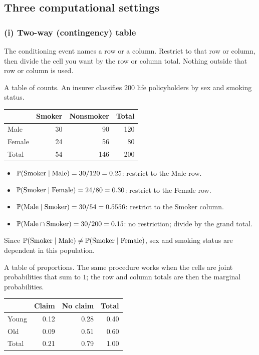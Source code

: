 \subsection{Three computational settings}

\subsubsection*{(i) Two-way (contingency) table}

The conditioning event names a row or a column. Restrict to that row or column,
then divide the cell you want by the row or column total. Nothing outside that
row or column is used.

A table of counts. An insurer classifies $200$ life policyholders by sex and
smoking status.

\begin{center}
\begin{tabular}{@{}lrrr@{}}
\toprule
 & Smoker & Nonsmoker & Total \\
\midrule
Male   & 30 & 90  & 120 \\
Female & 24 & 56  & 80  \\
\midrule
Total  & 54 & 146 & 200 \\
\bottomrule
\end{tabular}
\end{center}

\begin{itemize}[nosep]
\item $\mathbb{P}(\text{Smoker} \mid \text{Male}) = 30/120 = 0.25$: restrict to the Male row.
\item $\mathbb{P}(\text{Smoker} \mid \text{Female}) = 24/80 = 0.30$: restrict to the Female row.
\item $\mathbb{P}(\text{Male} \mid \text{Smoker}) = 30/54 = 0.5556$: restrict to the Smoker column.
\item $\mathbb{P}(\text{Male} \cap \text{Smoker}) = 30/200 = 0.15$: no restriction; divide by the grand total.
\end{itemize}
Since $\mathbb{P}(\text{Smoker} \mid \text{Male}) \ne \mathbb{P}(\text{Smoker} \mid \text{Female})$,
sex and smoking status are dependent in this population.

A table of proportions. The same procedure works when the cells are joint
probabilities that sum to $1$; the row and column totals are then the marginal
probabilities.

\begin{center}
\begin{tabular}{@{}lrrr@{}}
\toprule
 & Claim & No claim & Total \\
\midrule
Young & 0.12 & 0.28 & 0.40 \\
Old   & 0.09 & 0.51 & 0.60 \\
\midrule
Total & 0.21 & 0.79 & 1.00 \\
\bottomrule
\end{tabular}
\end{center}

